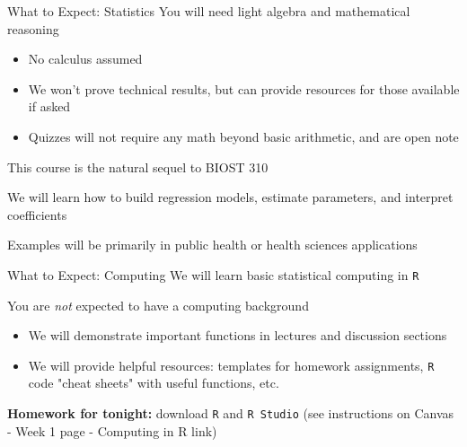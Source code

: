 \documentclass[10pt,t]{beamer}
\begin{document}
\begin{frame}{What to Expect: Statistics}
You will need light algebra and mathematical reasoning
\vspace{0.3cm}
\begin{itemize}
	\item No calculus assumed
	\item We won't prove technical results, but can provide resources for those available if asked
	\item Quizzes will not require any math beyond basic arithmetic, and are open note
\end{itemize}

\vspace{0.3cm}

This course is the natural sequel to BIOST 310 

\vspace{0.3cm}

We will learn how to build regression models, estimate parameters, and interpret coefficients 

\vspace{0.3cm}

Examples will be primarily in public health or health sciences applications

\end{frame}

\begin{frame}{What to Expect: Computing}
We will learn basic statistical computing in \texttt{R}

\vspace{0.3cm}

You are \textit{not} expected to have a computing background

\vspace{0.3cm}

\begin{itemize}
	\item We will demonstrate important functions in lectures and discussion sections
	\item We will provide helpful resources: templates for homework assignments, \texttt{R} code "cheat sheets" with useful functions, etc. 
\end{itemize}

\vspace{0.3cm}

\textbf{Homework for tonight:} download \texttt{R} and \texttt{R Studio} (see instructions on Canvas - Week 1 page - Computing in R link) 

\end{frame}
\end{document}
